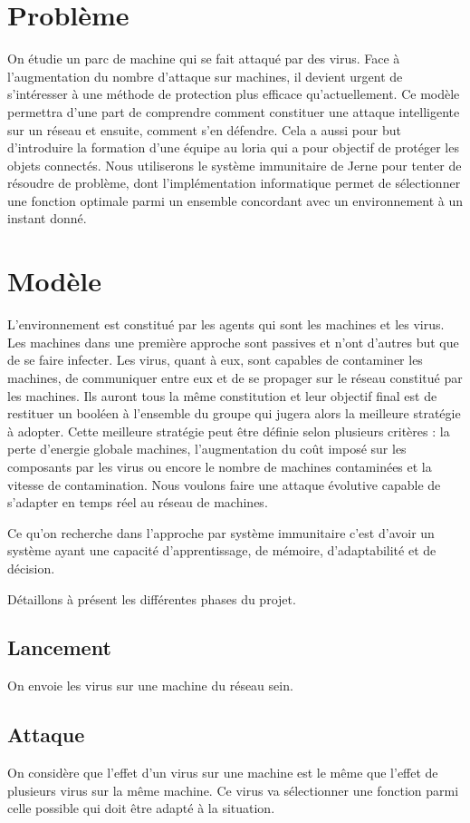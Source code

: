\documentclass[francais, 10pt]{article}
\begin{document}
\section{Problème}
On étudie un parc de machine qui se fait attaqué par des virus. Face à l'augmentation du nombre d'attaque sur machines, il devient urgent de s'intéresser à une méthode de protection plus efficace qu'actuellement. Ce modèle permettra d'une part de comprendre comment constituer une attaque intelligente sur un réseau et ensuite, comment s'en défendre. Cela a aussi pour but d'introduire la formation d'une équipe au loria qui a pour objectif de protéger les objets connectés. Nous utiliserons le système immunitaire de Jerne pour tenter de résoudre de problème, dont l'implémentation informatique permet de sélectionner une fonction optimale parmi un ensemble concordant avec un environnement à un instant donné.

\section{Modèle}
L'environnement est constitué par les agents qui sont les machines et les virus. Les machines dans une première approche sont passives et n'ont d'autres but que de se faire infecter. Les virus, quant à eux, sont capables de contaminer les machines, de communiquer entre eux et de se propager sur le réseau constitué par les machines. Ils auront tous la même constitution et leur objectif final est de restituer un booléen à l'ensemble du groupe qui jugera alors la meilleure stratégie à adopter. Cette meilleure stratégie peut être définie selon plusieurs critères : la perte d'energie globale machines, l'augmentation du coût imposé sur les composants par les virus ou encore le nombre de machines contaminées et la vitesse de contamination. Nous voulons faire une attaque évolutive capable de s'adapter en temps réel au réseau de machines.

Ce qu'on recherche dans l'approche par système immunitaire c'est d'avoir un système ayant une capacité d'apprentissage, de mémoire, d'adaptabilité et de décision.

Détaillons à présent les différentes phases du projet.
\subsection{Lancement}
On envoie les virus sur une machine du réseau sein.

\subsection{Attaque}
On considère que l'effet d'un virus sur une machine est le même que l'effet de plusieurs virus sur la même machine. Ce virus va sélectionner une fonction parmi celle possible qui doit être adapté à la situation.
\end{document}
